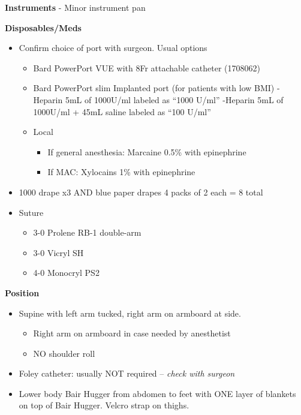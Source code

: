 \documentclass[
]{book}
\providecommand{\tightlist}{%
  \setlength{\itemsep}{0pt}\setlength{\parskip}{0pt}}
\begin{document}
\textbf{Instruments}
- Minor instrument pan

\textbf{Disposables/Meds}

\begin{itemize}
\tightlist
\item
  Confirm choice of port with surgeon. Usual options

  \begin{itemize}
  \tightlist
  \item
    Bard PowerPort VUE with 8Fr attachable catheter (1708062)
  \item
    Bard PowerPort slim Implanted port (for patients with low BMI)
    -Heparin 5mL of 1000U/ml labeled as ``1000 U/ml''
    -Heparin 5mL of 1000U/ml + 45mL saline labeled as ``100 U/ml''
  \item
    Local

    \begin{itemize}
    \tightlist
    \item
      If general anesthesia: Marcaine 0.5\% with epinephrine
    \item
      If MAC: Xylocains 1\% with epinephrine
    \end{itemize}
  \end{itemize}
\item
  1000 drape x3 AND blue paper drapes 4 packs of 2 each = 8 total
\item
  Suture

  \begin{itemize}
  \tightlist
  \item
    3-0 Prolene RB-1 double-arm
  \item
    3-0 Vicryl SH
  \item
    4-0 Monocryl PS2
  \end{itemize}
\end{itemize}

\textbf{Position}

\begin{itemize}
\tightlist
\item
  Supine with left arm tucked, right arm on armboard at side.

  \begin{itemize}
  \tightlist
  \item
    Right arm on armboard in case needed by anesthetist
  \item
    NO shoulder roll
  \end{itemize}
\item
  Foley catheter: usually NOT required -- \emph{check with surgeon}
\item
  Lower body Bair Hugger from abdomen to feet with ONE layer of blankets on top of Bair Hugger. Velcro strap on thighs.
\end{itemize}
\end{document}

